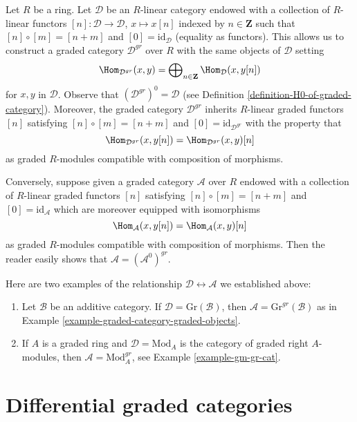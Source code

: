 \begin{remark}
\label{remark-graded-shift-functors}
Let $R$ be a ring. Let $\mathcal{D}$ be an $R$-linear category endowed with a
collection of $R$-linear functors $[n] : \mathcal{D} \to \mathcal{D}$,
$x \mapsto x[n]$ indexed by $n \in \mathbf{Z}$ such that
$[n] \circ [m] = [n + m]$ and $[0] = \text{id}_\mathcal{D}$ (equality as
functors). This allows us to construct a graded category $\mathcal{D}^{gr}$
over $R$ with the same objects of $\mathcal{D}$ setting
$$
\Hom_{\mathcal{D}^{gr}}(x, y) =
\bigoplus\nolimits_{n \in \mathbf{Z}} \Hom_\mathcal{D}(x, y[n])
$$
for $x, y$ in $\mathcal{D}$. Observe that $(\mathcal{D}^{gr})^0 = \mathcal{D}$
(see Definition \ref{definition-H0-of-graded-category}). Moreover, the graded
category $\mathcal{D}^{gr}$ inherits $R$-linear graded functors $[n]$
satisfying $[n] \circ [m] = [n + m]$ and $[0] = \text{id}_{\mathcal{D}^{gr}}$
with the property that
$$
\Hom_{\mathcal{D}^{gr}}(x, y[n]) = \Hom_{\mathcal{D}^{gr}}(x, y)[n]
$$
as graded $R$-modules compatible with composition of morphisms.

\medskip\noindent
Conversely, suppose given a graded category $\mathcal{A}$ over $R$ endowed
with a collection of $R$-linear graded functors $[n]$
satisfying $[n] \circ [m] = [n + m]$ and $[0] = \text{id}_\mathcal{A}$
which are moreover equipped with isomorphisms
$$
\Hom_\mathcal{A}(x, y[n]) = \Hom_\mathcal{A}(x, y)[n]
$$
as graded $R$-modules compatible with composition of morphisms. Then
the reader easily shows that $\mathcal{A} = (\mathcal{A}^0)^{gr}$.

\medskip\noindent
Here are two examples of the relationship
$\mathcal{D} \leftrightarrow \mathcal{A}$ we established above:
\begin{enumerate}
\item Let $\mathcal{B}$ be an additive category. If
$\mathcal{D} = \text{Gr}(\mathcal{B})$, then
$\mathcal{A} = \text{Gr}^{gr}(\mathcal{B})$ as in
Example \ref{example-graded-category-graded-objects}.
\item If $A$ is a graded ring and $\mathcal{D} = \text{Mod}_A$
is the category of graded right $A$-modules, then
$\mathcal{A} = \text{Mod}^{gr}_A$, see Example \ref{example-gm-gr-cat}.
\end{enumerate}
\end{remark}






\section{Differential graded categories}
\label{section-dga-categories}


